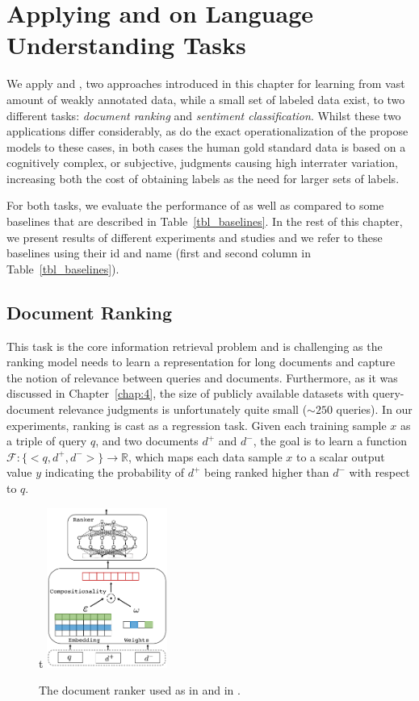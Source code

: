 \section{Applying \cws and \fwl on Language Understanding Tasks}
We apply \cws and \fwl, two approaches introduced in this chapter for learning from vast amount of weakly annotated data, while a small set of labeled data exist, to two different tasks: \emph{document ranking} and \emph{sentiment classification}. 
Whilst these two applications differ considerably, as do the exact operationalization of the propose models to these cases, in both cases the human gold standard data is based on a cognitively complex, or subjective, judgments causing high interrater variation, increasing both the cost of obtaining labels as the need for larger sets of labels.


For both tasks, we evaluate the performance of \cws as well as \fwl compared to some baselines that are described in Table~\ref{tbl_baselines}. In the rest of this chapter, we present results of different experiments and studies and we refer to these baselines using their id and name (first and second column in Table~\ref{tbl_baselines}).

\subsection{Document Ranking}
This task is the core information retrieval problem and is challenging as the ranking model needs to learn a representation for long documents and capture the notion of relevance between queries and documents. Furthermore, as it was discussed in Chapter~\ref{chap:4}, the size of publicly available datasets with query-document relevance judgments is unfortunately quite small ($\sim 250$ queries).
%
In our experiments, ranking is cast as a regression task. Given each training sample $x$ as a triple of query $q$, and two documents $d^+$ and $d^-$, the goal is to learn a function $\mathcal{F} : \{<q, d^+, d^->\} \rightarrow \mathbb{R}$, which maps each data sample $x$ to a scalar output value $y$ indicating the probability of $d^+$ being ranked higher than $d^-$ with respect to $q$. 

\begin{figure}{t}
    \centering
            \includegraphics[width=0.35\textwidth]{03-part-02/chapter-05/figs_and_tables/fig_ranker.pdf}
    \caption{The document ranker used as \tch in \cws and \std in \fwl.}
    \label{fig:ranker}
\end{figure}


